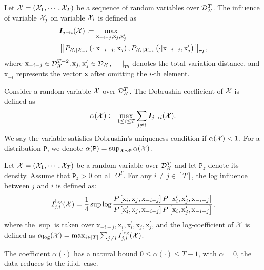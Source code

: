 \begin{definition}\label{def:influence}
    Let $\mathcal{X} = (\mathcal{X}_1, \cdots , \mathcal{X}_T)$ be a sequence of random variables over $\mathcal{D}_{\mathcal{X}}^{T}$.
    The influence of variable $\mathcal{X}_j$ on variable $\mathcal{X}_i$ is defined as
    \begin{align*}
        &\bm{I}_{j \rightarrow i}(\mathcal{X})
        \coloneqq
        \max_{ \text{x}_{ -i-j}, \text{x}_j, \text{x}_j^\prime  }
        \\
        &
        \left\lvert \left\lvert
        P_{\mathcal{X}_i | \mathcal{X}_{-i}} \left( \cdot | \text{x}_{-i-j}, \text{x}_j \right),
        P_{\mathcal{X}_i | \mathcal{X}_{-i}} \left( \cdot | \text{x}_{-i-j}, \text{x}_j^\prime \right)
        \right\rvert \right\rvert_{\texttt{TV}}
        ,
    \end{align*}
    where $\text{x}_{-i-j} \in \mathcal{D}_{\mathcal{X}}^{T-2}, \text{x}_j, \text{x}_j^\prime \in \mathcal{D}_{\mathcal{X}}$, $\left\lvert \left\lvert\cdot\right\rvert \right\rvert_{\texttt{TV}}$ denotes the total variation distance, and $\text{x}_{-i}$ represents the vector \textbf{x} after omitting the $i$-th element.
\end{definition}



\begin{definition}
    Consider a random variable $\mathcal{X}$ over $\mathcal{D}_{\mathcal{X}}^T$.
    The Dobrushin coefficient of $\mathcal{X}$ is defined as 
    \[
    \alpha(\mathcal{X}) \coloneqq  \max_{1\leq i \leq T} \sum_{j \neq i} \bm{I}_{j \rightarrow i} (\mathcal{X}).
    \]
    We say the variable satisfies Dobrushin's uniqueness condition if $\alpha(\mathcal{X}) < 1$.
    For a distribution $\mathtt{P}$, we denote $\alpha(\mathtt{P}) = \sup_{\mathcal{X}\sim\mathtt{P}} \alpha(\mathcal{X})$.
\end{definition}
\begin{definition}
        Let $\mathcal{X} = (\mathcal{X}_1, \cdots, \mathcal{X}_T)$ be a random variable over $\mathcal{D}_{\mathcal{X}}^T$ and let $\mathtt{P}_z$ denote its density.
        Assume that $\mathtt{P}_{z} > 0$ on all $\Omega^T$.
        For any $i \neq j \in [T]$, the log influence between $j$ and $i$ is defined as:
    {\small
    \begin{equation*}
        I^{\log}_{j, i}(\mathcal{X})
        =
        \frac{1}{4}
        \sup
        \log
        \frac{ P
        \left[
        \text{x}_i, \text{x}_j, \text{x}_{-i-j}
        \right] 
        P
        \left[
        \text{x}_i^\prime, \text{x}_j^\prime, \text{x}_{-i-j}
        \right]
        }{
    P
        \left[
        \text{x}_i^\prime, \text{x}_j, \text{x}_{-i-j}
        \right] 
    P
        \left[
        \text{x}_i, \text{x}_j^\prime, \text{x}_{-i-j}
        \right] 
        },
    \end{equation*}
    }
    where the $\sup$ is taken over $\text{x}_{-i-j}, \text{x}_i, \text{x}_i^\prime, \text{x}_j, \text{x}_j^\prime$,
    and the log-coefficient of $\mathcal{X}$ is defined as $\alpha_{\log}(\mathcal{X}) = \max_{i \in [T]} \sum_{j \neq i} I^{\log}_{j, i}(\mathcal{X})$.
\end{definition}
The coefficient $\alpha(\cdot)$ has a natural bound $0 \leq \alpha(\cdot) \leq T-1$, with $\alpha = 0$, the data reduces to the i.i.d. case.

